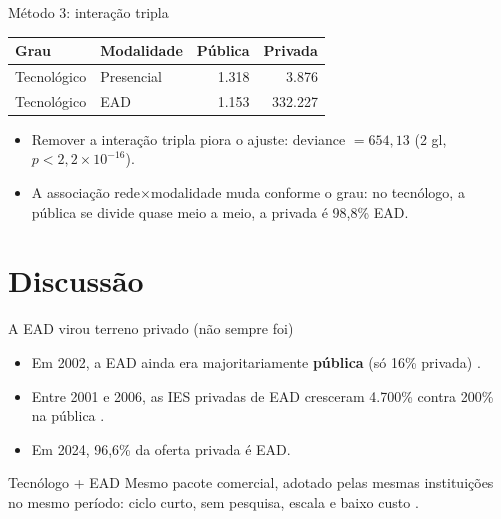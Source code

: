\documentclass{beamer}
\begin{document}
\begin{frame}{Método 3: interação tripla}
  \begin{table}
    \centering
    \small
    \begin{tabular}{llrr}
      \toprule
      Grau & Modalidade & Pública & Privada \\
      \midrule
      Tecnológico & Presencial & 1.318 & 3.876 \\
      Tecnológico & EAD        & 1.153 & 332.227 \\
      \bottomrule
    \end{tabular}
  \end{table}
  \begin{itemize}
    \item Remover a interação tripla piora o ajuste: deviance $=654{,}13$ (2 gl, $p<2{,}2\times10^{-16}$).
    \item A associação rede$\times$modalidade muda conforme o grau: no tecnólogo, a pública se divide quase meio a meio, a privada é 98,8\% EAD.
  \end{itemize}
\end{frame}

\section{Discussão}

\begin{frame}{A EAD virou terreno privado (não sempre foi)}
  \begin{itemize}
    \item Em 2002, a EAD ainda era majoritariamente \textbf{pública} (só 16\% privada) \parencite{pintoAcessoEducacaoSuperior2004}.
    \item Entre 2001 e 2006, as IES privadas de EAD cresceram 4.700\% contra 200\% na pública \parencite{segenreichExpansaoPrivatizacaoDiferenciacao2009}.
    \item Em 2024, 96,6\% da oferta privada é EAD.
  \end{itemize}
  \begin{block}{Tecnólogo + EAD}
    Mesmo pacote comercial, adotado pelas mesmas instituições no mesmo período: ciclo curto, sem pesquisa, escala e baixo custo \parencite{carvalhoMercantilizacaoEducacaoSuperior2013}.
  \end{block}
\end{frame}
\end{document}
